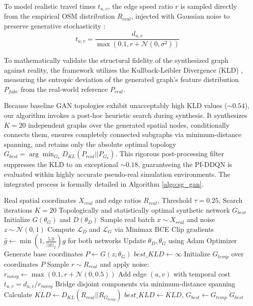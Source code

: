 \documentclass{article}
\begin{document}
To model realistic travel times $t_{u,v}$, the edge speed ratio $r$ is sampled directly from the empirical OSM distribution $R_{real}$, injected with Gaussian noise to preserve generative stochasticity \cite{daganzo1994cell}:
\begin{equation}
t_{u,v} = \frac{d_{u,v}}{\max(0.1, r + \mathcal{N}(0, \sigma^2))}
\end{equation}

To mathematically validate the structural fidelity of the synthesized graph against reality, the framework utilizes the Kullback-Leibler Divergence (KLD) \cite{kullback1951information}, measuring the entropic deviation of the generated graph's feature distribution $P_{fake}$ from the real-world reference $P_{real}$. 

Because baseline GAN topologies exhibit unacceptably high KLD values ($\sim0.54$), our algorithm invokes a post-hoc heuristic search during synthesis. It synthesizes $K=20$ independent graphs over the generated spatial nodes, conditionally connects them, ensures completely connected subgraphs via minimum-distance spanning, and retains only the absolute optimal topology $G_{best} = \arg \min_{G_k} D_{KL}(P_{real} || P_{G_k})$. This rigorous post-processing filter suppresses the KLD to an exceptional $\sim0.18$, guaranteeing the PI-DDQN is evaluated within highly accurate pseudo-real simulation environments. The integrated process is formally detailed in Algorithm \ref{algo:sg_gan}.

\begin{algorithm}[ht]
\caption{Optimized SG-GAN Synthesis with KLD Heuristic Search}
\label{algo:sg_gan}
\begin{algorithmic}[1]
\REQUIRE Real spatial coordinates $X_{real}$ and edge ratios $R_{real}$, Threshold $\tau=0.25$, Search iterations $K=20$
\ENSURE Topologically and statistically optimal synthetic network $G_{best}$
\STATE Initialize $G(\theta_G)$ and $D(\theta_D)$
    \STATE Sample real batch $x \sim X_{real}$ and noise $z \sim \mathcal{N}(0, 1)$
    \STATE Compute $\mathcal{L}_D$ and $\mathcal{L}_G$ via Minimax BCE
    \STATE Clip gradients $\hat{g} \leftarrow \min \left( 1, \frac{5.0}{||g||_2} \right) g$ for both networks
    \STATE Update $\theta_D, \theta_G$ using Adam Optimizer
\ENDFOR
\STATE Generate base coordinates $P \leftarrow G(z; \theta_G)$
\STATE $best\_KLD \leftarrow \infty$
    \STATE Initialize $G_{temp}$ over coordinates $P$
            \STATE Sample $r \sim R_{real}$ and apply noise: $r_{noisy} \leftarrow \max(0.1, r + \mathcal{N}(0, 0.5))$
            \STATE Add edge $(u, v)$ with temporal cost $t_{u,v} = d_{u,v}/r_{noisy}$
        \ENDIF
    \ENDFOR
        \STATE Bridge disjoint components via minimum-distance spanning
    \ENDWHILE
    \STATE Calculate $KLD \leftarrow D_{KL}(R_{real} || R_{G_{temp}})$
        \STATE $best\_KLD \leftarrow KLD$, \quad $G_{best} \leftarrow G_{temp}$
    \ENDIF
\ENDFOR
\RETURN $G_{best}$
\end{algorithmic}
\end{algorithm}
\end{document}
